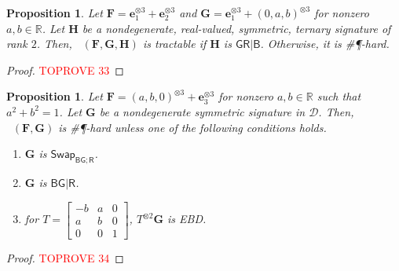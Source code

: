\documentclass[11pt]{article}
\newtheorem{proposition}[theorem]{Proposition}
\DeclareMathOperator{\holts}{Holant^*_3}
\newcommand{\db}{\mathsf{B}}
\newcommand{\dg}{\mathsf{G}}
\newcommand{\dr}{\mathsf{R}}
\newcommand{\swhelper}[1]{$\mathsf{Swap}_{#1}$\xspace}
\newcommand{\swbg}{\swhelper{\db \dg; \dr}}
\newcommand{\sph}{\#\P-hard\xspace}
\newcommand{\teh}{^{\otimes 3}}
\newcommand{\tew}{^{\otimes 2}}
\newcommand{\strspt}{\textsf{EBD}\xspace}
\newcommand{\bdgr}{\dg \dr | \db}
\begin{document}
\begin{proposition}\label{prop:dichotomy-3-signatures-geneq-b-gr}
  Let $\mathbf{F} = \mathbf{e}_1\teh + \mathbf{e}_2\teh$ and $\mathbf{G} = \mathbf{e}_1\teh + (0, a, b)\teh$ for nonzero $a, b \in \mathbb{R}$.
  Let $\mathbf{H}$ be a nondegenerate, real-valued, symmetric, ternary signature of rank $2$.
  Then, $\holts(\mathbf{F}, \mathbf{G}, \mathbf{H})$ is tractable if $\mathbf{H}$ is $\bdgr$.
  Otherwise, it is \sph.
\end{proposition}
\begin{proof}\textcolor{red}{TOPROVE 33}\end{proof}

\begin{proposition}\label{prop:bg-r-d-do-not-mix}
  Let $\mathbf{F} = (a, b, 0)\teh + \mathbf{e}_3\teh$ for nonzero $a, b \in \mathbb{R}$ such that $a^2 + b^2 = 1$.
  Let $\mathbf{G}$ be a nondegenerate symmetric signature in $\mathcal{D}$.
  Then, $\holts(\mathbf{F}, \mathbf{G})$ is \sph unless one of the following conditions holds.
  \begin{enumerate}
    \item $\mathbf{G}$ is \swbg.
    \item $\mathbf{G}$ is $\db \dg | \dr$.
    \item for $T = \begin{bmatrix}
        -b & a & 0 \\
        a & b & 0 \\
        0 & 0 & 1
      \end{bmatrix}$, $T\tew \mathbf{G}$ is \strspt.
  \end{enumerate}
\end{proposition}
\begin{proof}\textcolor{red}{TOPROVE 34}\end{proof}
\end{document}
